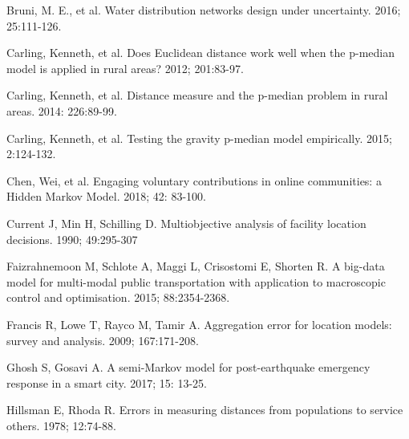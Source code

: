 \documentclass[twoside,twocolumn]{article}
\begin{document}
\begin{thebibliography}{99}
Bruni, M. E., et al.
\newblock Water distribution networks design under uncertainty.
 2016; 25:111-126.

Carling, Kenneth, et al.
\newblock Does Euclidean distance work well when the p-median model is applied in rural areas?
 2012; 201:83-97.

Carling, Kenneth, et al.
\newblock Distance measure and the p-median problem in rural areas.
 2014: 226:89-99.

Carling, Kenneth, et al.
\newblock Testing the gravity p-median model empirically.
 2015; 2:124-132.

Chen, Wei, et al.
\newblock Engaging voluntary contributions in online communities: a Hidden Markov Model.
 2018; 42: 83-100.

Current J, Min H, Schilling D.
\newblock Multiobjective analysis of facility location decisions.
 1990; 49:295-307

Faizrahnemoon M, Schlote A, Maggi L, Crisostomi E, Shorten R.
\newblock A big-data model for multi-modal public transportation with application to macroscopic control and optimisation.
 2015; 88:2354-2368.

Francis R, Lowe T, Rayco M, Tamir A.
\newblock Aggregation error for location models: survey and analysis.
 2009; 167:171-208.

Ghosh S, Gosavi A.
\newblock A semi-Markov model for post-earthquake emergency response in a smart city.
 2017; 15: 13-25.

Hillsman E, Rhoda R.
\newblock Errors in measuring distances from populations to service others.
 1978; 12:74-88.


\end{thebibliography}
\end{document}
